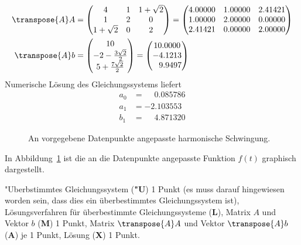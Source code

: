 \begin{loesung}
\begin{align*}
\transpose{A}A&=
\begin{pmatrix}
         4&1&1+\sqrt{2}\\
         1&2&         0\\
1+\sqrt{2}&0&         2
\end{pmatrix}
=\begin{pmatrix}
   4.00000 & 1.00000 & 2.41421 \\
   1.00000 & 2.00000 & 0.00000 \\
   2.41421 & 0.00000 & 2.00000
\end{pmatrix}
\\
\transpose{A}b&=
\begin{pmatrix}
10\\
-2-\frac{3\sqrt{2}}2\\
5+\frac{7\sqrt{2}}2
\end{pmatrix}
=\begin{pmatrix}
10.0000\\
-4.1213\\
\phantom{-}9.9497
\end{pmatrix}
\end{align*}
Numerische Lösung des Gleichungssystems liefert 
\begin{align*}
a_0&=\phantom{-}0.085786\\
a_1&=-2.103553\\
b_1&=\phantom{-}4.871320
\end{align*}
\begin{figure}
\centering
{}
\caption{An vorgegebene Datenpunkte angepasste harmonische Schwingung.
\label{40000034:1}
}
\end{figure}
In Abbildung~\ref{40000034:1} ist die an die Datenpunkte angepasste
Funktion $f(t)$ graphisch dargestellt.
\end{loesung}

\begin{bewertung}
"Uberbstimmtes Gleichungssystem ({\bf "U}) 1 Punkt (es muss darauf hingewiesen
worden sein, dass dies ein überbestimmtes Gleichungssystem ist),
Lösungsverfahren für überbestimmte Gleichungssysteme ({\bf L}),
Matrix $A$ und Vektor $b$ ({\bf M}) 1 Punkt,
Matrix $\transpose{A}A$ und Vektor $\transpose{A}b$ ({\bf A}) je 1 Punkt,
Lösung ({\bf X}) 1 Punkt.
\end{bewertung}

